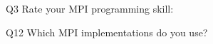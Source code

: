 \begin{description}%
\item{Q3} Rate your MPI programming skill:%
\item{Q12} Which MPI implementations do you use?%
\end{description}%
